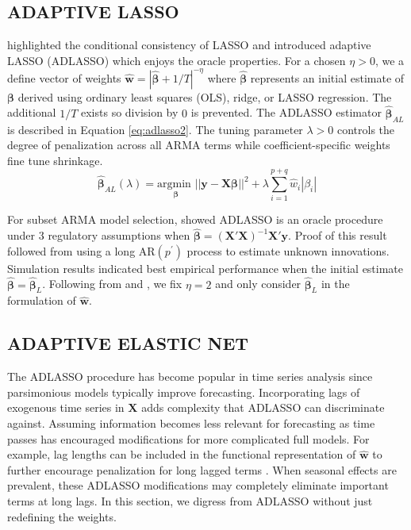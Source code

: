 \subsection{ADAPTIVE LASSO}

\cite{Zou2006} highlighted the conditional consistency of LASSO and introduced adaptive LASSO (ADLASSO) which enjoys the oracle properties. For a chosen $\eta>0$, we a define vector of weights $\hat{\bm{w}}=|\hat{\bm{\beta}}+1/T|^{-\eta}$ where $\hat{\bm{\beta}}$ represents an initial estimate of $\bm{\beta}$ derived using ordinary least squares (OLS), ridge, or LASSO regression. The additional $1/T$ exists so division by $0$ is prevented. The ADLASSO estimator $\hat{\bm{\beta}}_{AL}$ is described in Equation \ref{eq:adlasso2}. The tuning parameter $\lambda>0$ controls the degree of penalization across all ARMA terms while coefficient-specific weights fine tune shrinkage.
\begin{equation}
\label{eq:adlasso2}
\hat{\bm{\beta}}_{AL} (\lambda)= \underset{\bm{\beta}}{\textrm{argmin }}  ||\bm{y}-\bm{X}\bm{\beta}||^2 + \lambda \sum\limits_{i=1}^{p+q} \hat{w}_{i}|\beta_i|
\end{equation}

For subset ARMA model selection, \cite{Chen2011} showed ADLASSO is an oracle procedure under 3 regulatory assumptions when $\hat{\bm{\beta}}=(\bm{X}'\bm{X})^{-1}\bm{X}'\bm{y}$. Proof of this result followed from using a long AR$(p^\prime)$ process to estimate unknown innovations. Simulation results indicated best empirical performance when the initial estimate $\hat{\bm{\beta}}=\hat{\bm{\beta}}_L$. Following from \cite{Zou2006} and \cite{Chen2011}, we fix $\eta=2$ and only consider $\hat{\bm{\beta}}_L$ in the formulation of $\hat{\bm{w}}$.

\subsection{ADAPTIVE ELASTIC NET}
The ADLASSO procedure has become popular in time series analysis since parsimonious models typically improve forecasting. Incorporating lags of exogenous time series in $\bm{X}$ adds complexity that ADLASSO can discriminate against. Assuming information becomes less relevant for forecasting as time passes has encouraged modifications for more complicated full models. For example, lag lengths can be included in the functional representation of $\hat{\bm{w}}$ to further encourage penalization for long lagged terms \citep{Park2013,Konzen2016}. When seasonal effects are prevalent, these ADLASSO modifications may completely eliminate important terms at long lags. In this section, we digress from ADLASSO without just redefining the weights.

